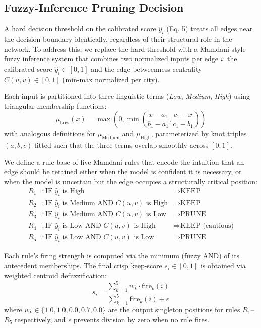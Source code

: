 \documentclass[journal]{IEEEtran}
\begin{document}
\subsection{Fuzzy-Inference Pruning Decision}
\label{sec:fuzzy}

A hard decision threshold on the calibrated score $\hat{y}_i$ (Eq. 5) treats all edges near the decision boundary identically, regardless of their structural role in the network. To address this, we replace the hard threshold with a Mamdani-style fuzzy inference system that combines two normalized inputs per edge $i$: the calibrated score $\hat{y}_i \in [0,1]$ and the edge betweenness centrality $C(u,v) \in [0,1]$ (min-max normalized per city).

Each input is partitioned into three linguistic terms (\textit{Low}, \textit{Medium}, \textit{High}) using triangular membership functions:
\begin{equation}
    \mu_{\text{Low}}(x) = \max\left(0, \min\left(\frac{x - a_1}{b_1 - a_1}, \frac{c_1 - x}{c_1 - b_1}\right)\right)
\end{equation}
with analogous definitions for $\mu_{\text{Medium}}$ and $\mu_{\text{High}}$, parameterized by knot triples $(a,b,c)$ fitted such that the three terms overlap smoothly across $[0,1]$.

We define a rule base of five Mamdani rules that encode the intuition that an edge should be retained either when the model is confident it is necessary, or when the model is uncertain but the edge occupies a structurally critical position:
\begin{align}
    R_1&: \text{IF } \hat{y}_i \text{ is High} &\Rightarrow \text{KEEP} \\
    R_2&: \text{IF } \hat{y}_i \text{ is Medium AND } C(u,v) \text{ is High} &\Rightarrow \text{KEEP} \\
    R_3&: \text{IF } \hat{y}_i \text{ is Medium AND } C(u,v) \text{ is Low} &\Rightarrow \text{PRUNE} \\
    R_4&: \text{IF } \hat{y}_i \text{ is Low AND } C(u,v) \text{ is High} &\Rightarrow \text{KEEP (cautious)} \\
    R_5&: \text{IF } \hat{y}_i \text{ is Low AND } C(u,v) \text{ is Low} &\Rightarrow \text{PRUNE}
\end{align}

Each rule's firing strength is computed via the minimum (fuzzy AND) of its antecedent memberships. The final crisp keep-score $s_i \in [0,1]$ is obtained via weighted centroid defuzzification:
\begin{equation}
    s_i = \frac{\sum_{k=1}^{5} w_k \cdot \text{fire}_k(i)}{\sum_{k=1}^{5} \text{fire}_k(i) + \epsilon}
\end{equation}
where $w_k \in \{1.0, 1.0, 0.0, 0.7, 0.0\}$ are the output singleton positions for rules $R_1$--$R_5$ respectively, and $\epsilon$ prevents division by zero when no rule fires.
\end{document}

